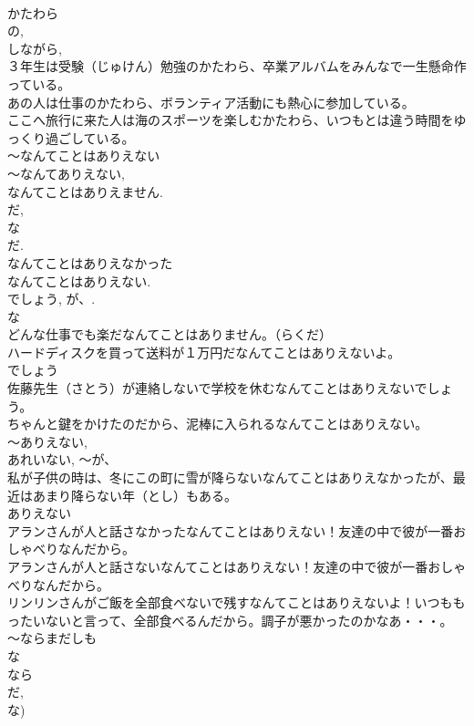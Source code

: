 \documentclass[8pt]{extreport}
\begin{document}
\begin{CJK}{UTF8}{min}
\\	かたわら
\\	の, 
\\	しながら, 
\\	３年生は受験（じゅけん）勉強のかたわら、卒業アルバムをみんなで一生懸命作っている。
\\	あの人は仕事のかたわら、ボランティア活動にも熱心に参加している。
\\	ここへ旅行に来た人は海のスポーツを楽しむかたわら、いつもとは違う時間をゆっくり過ごしている。
\\	～なんてことはありえない
\\	～なんてありえない, 
\\	なんてことはありえません.
\\	だ, 
\\	な
\\	だ.
\\	なんてことはありえなかった 
\\	なんてことはありえない. 
\\	でしょう, が、. 
\\	な
\\	どんな仕事でも楽だなんてことはありません。（らくだ）
\\	ハードディスクを買って送料が１万円だなんてことはありえないよ。
\\	でしょう 
\\	佐藤先生（さとう）が連絡しないで学校を休むなんてことはありえないでしょう。
\\	ちゃんと鍵をかけたのだから、泥棒に入られるなんてことはありえない。
\\	～ありえない, 
\\	あれいない, ～が、 
\\	私が子供の時は、冬にこの町に雪が降らないなんてことはありえなかったが、最近はあまり降らない年（とし）もある。
\\	ありえない 
\\	アランさんが人と話さなかったなんてことはありえない！友達の中で彼が一番おしゃべりなんだから。
\\	アランさんが人と話さないなんてことはありえない！友達の中で彼が一番おしゃべりなんだから。
\\	リンリンさんがご飯を全部食べないで残すなんてことはありえないよ！いつももったいないと言って、全部食べるんだから。調子が悪かったのかなあ・・・。
\\	～ならまだしも
\\	な
\\	なら 
\\	だ, 
\\	な)

\end{CJK}
\end{document}
